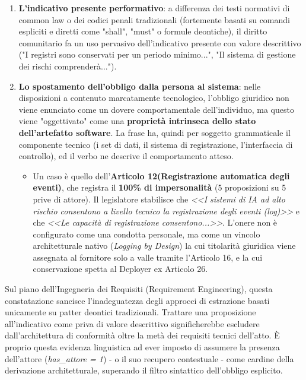 \documentclass[12pt,a4paper,oneside]{report}
\begin{document}
\begin{enumerate}
    \item \textbf{L'indicativo presente performativo}: a differenza dei testi normativi di common law o dei codici penali tradizionali (fortemente basati su comandi espliciti e diretti come "shall", "must" o formule deontiche), il diritto comunitario fa un uso pervasivo dell'indicativo presente con valore descrittivo ("I registri sono conservati per un periodo minimo...", "Il sistema di gestione dei rischi comprenderà...").
    \item \textbf{Lo spostamento dell'obbligo dalla persona al sistema}: nelle disposizioni a contenuto marcatamente tecnologico, l'obbligo giuridico non viene enunciato come un dovere comportamentale dell'individuo, ma questo viene "oggettivato" come una \textbf{proprietà intrinseca dello stato dell'artefatto software}. La frase ha, quindi per soggetto grammaticale il componente tecnico (i set di dati, il sistema di registrazione, l'interfaccia di controllo), ed il verbo ne descrive il comportamento atteso.
    \begin{itemize}
        \item Un caso è quello dell'\textbf{Articolo 12(Registrazione automatica degli eventi)}, che registra il \textbf{100\% di impersonalità} (5 proposizioni su 5 prive di attore). Il legislatore stabilisce che \textit{<<I sistemi di IA ad alto rischio consentono a livello tecnico la registrazione degli eventi (log)>>} e che \textit{<<Le capacità di registrazione consentono...>>}. L'onere non è configurato come una condotta personale, ma come un vincolo architetturale nativo (\textit{Logging by Design}) la cui titolarità giuridica viene assegnata al fornitore solo a valle tramite l'Articolo 16, e la cui conservazione spetta al Deployer ex Articolo 26.
    \end{itemize}
\end{enumerate}
Sul piano dell'Ingegneria dei Requisiti (Requirement Engineering), questa constatazione sancisce l'inadeguatezza degli approcci di estrazione basati unicamente su patter deontici tradizionali. Trattare una proposizione all'indicativo come priva di valore descrittivo significherebbe escludere dall'architettura di conformità oltre la metà dei requisiti tecnici dell'atto.
È proprio questa evidenza linguistica ad ever imposto di assumere la presenza dell'attore (\textit{has\_attore = 1}) - o il suo recupero contestuale - come cardine della derivazione architetturale, superando il filtro sintattico dell'obbligo esplicito.
\end{document}
